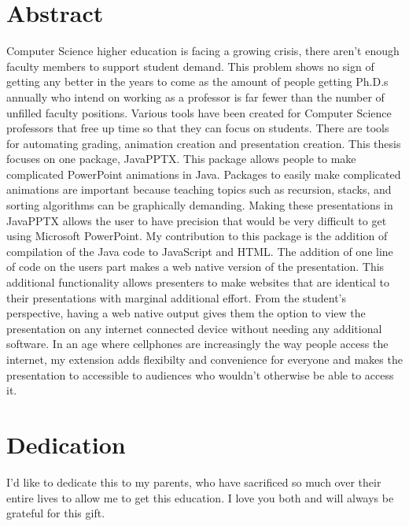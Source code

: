 \documentclass[12pt,twoside]{reedthesis}
\begin{document}
    \chapter*{Abstract}
	Computer Science higher education is facing a growing crisis, there aren't enough faculty members to support student demand. This problem shows no sign of getting any better in the years to come as the amount of people getting Ph.D.s annually who intend on working as a professor is far fewer than the number of unfilled faculty positions. Various tools have been created for Computer Science professors that free up time so that they can focus on students. There are tools for automating grading, animation creation and presentation creation. This thesis focuses on one package, JavaPPTX. This package allows people to make complicated PowerPoint animations in Java. Packages to easily make complicated animations are important because teaching topics such as recursion, stacks, and sorting algorithms  can be graphically demanding. Making these presentations in JavaPPTX allows the user to have precision that would be very difficult to get using Microsoft PowerPoint. My contribution to this package is the addition of compilation of the Java code to JavaScript and HTML. The addition of one line of code on the users part makes a web native version of the presentation. This additional functionality allows presenters to make websites that are identical to their presentations with marginal additional effort. From the student's perspective, having a web native output gives them the option to view the presentation on any internet connected device without needing any additional software. In an age where cellphones are increasingly the way people access the internet, my extension adds flexibilty and convenience for everyone and makes the presentation to accessible to audiences who wouldn't otherwise be able to access it. 
	
	\chapter*{Dedication}
	I'd like to dedicate this to my parents, who have sacrificed so much over their entire lives to allow me to get this education. I love you both and will always be grateful for this gift. 

  \mainmatter %
  \pagestyle{fancyplain} %

\end{document}
